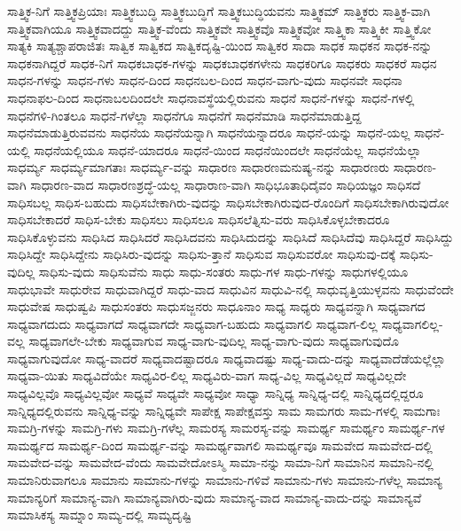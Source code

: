 {ಸಾತ್ತ್ವಿಕ-ನಿಗೆ
ಸಾತ್ತ್ವಿಕಪ್ರಿಯಾಃ
ಸಾತ್ತ್ವಿಕಬುದ್ಧಿ
ಸಾತ್ತ್ವಿಕಬುದ್ಧಿಗೆ
ಸಾತ್ತ್ವಿಕಬುದ್ಧಿಯವನು
ಸಾತ್ತ್ವಿಕಮ್
ಸಾತ್ತ್ವಿಕರು
ಸಾತ್ತ್ವಿಕ-ವಾಗಿ
ಸಾತ್ತ್ವಿಕವಾಗಿಯೂ
ಸಾತ್ತ್ವಿಕವಾದದ್ದು
ಸಾತ್ತ್ವಿಕ-ವೆಂದು
ಸಾತ್ತ್ವಿಕವೇ
ಸಾತ್ತ್ವಿಕವೊ
ಸಾತ್ತ್ವಿಕವೋ
ಸಾತ್ತ್ವಿಕಾ
ಸಾತ್ತ್ವಿಕೀ
ಸಾತ್ತ್ವಿಕೋ
ಸಾತ್ಯಕಿ
ಸಾತ್ಯಶ್ಚಾಪರಾಜಿತಃ
ಸಾತ್ವಿಕ
ಸಾತ್ವಿಕದ
ಸಾತ್ವಿಕದೃಷ್ಟಿ-ಯಿಂದ
ಸಾತ್ವಿಕರ
ಸಾದಾ
ಸಾಧಕ
ಸಾಧಕನ
ಸಾಧಕ-ನನ್ನು
ಸಾಧಕನಾಗಿದ್ದರೆ
ಸಾಧಕ-ನಿಗೆ
ಸಾಧಕಬಾಧಕ-ಗಳನ್ನು
ಸಾಧಕಬಾಧಕಗಳೇನು
ಸಾಧಕರಿಗೂ
ಸಾಧಕರು
ಸಾಧಕರೆ
ಸಾಧನ
ಸಾಧನ-ಗಳನ್ನು
ಸಾಧನ-ಗಳು
ಸಾಧನ-ದಿಂದ
ಸಾಧನಬಲ-ದಿಂದ
ಸಾಧನ-ವಾಗು-ವುದು
ಸಾಧನವೇ
ಸಾಧನಾ
ಸಾಧನಾಫಲ-ದಿಂದ
ಸಾಧನಾಬಲದಿಂದಲೇ
ಸಾಧನಾವಸ್ಥೆಯಲ್ಲಿರುವನು
ಸಾಧನೆ
ಸಾಧನೆ-ಗಳನ್ನು
ಸಾಧನೆ-ಗಳಲ್ಲಿ
ಸಾಧನೆಗಳಿ-ಗಿಂತಲೂ
ಸಾಧನೆ-ಗಳೆಲ್ಲಾ
ಸಾಧನೆಗೂ
ಸಾಧನೆಗೆ
ಸಾಧನೆಮಾಡಿ
ಸಾಧನೆಮಾಡುತ್ತಿದ್ದ
ಸಾಧನೆಮಾಡುತ್ತಿರುವವನು
ಸಾಧನೆಯ
ಸಾಧನೆಯನ್ನಾಗಿ
ಸಾಧನೆಯನ್ನಾದರೂ
ಸಾಧನೆ-ಯನ್ನು
ಸಾಧನೆ-ಯಲ್ಲ
ಸಾಧನೆ-ಯಲ್ಲಿ
ಸಾಧನೆಯಲ್ಲಿಯೂ
ಸಾಧನೆ-ಯಾದರೂ
ಸಾಧನೆ-ಯಿಂದ
ಸಾಧನೆಯಿಂದಲೇ
ಸಾಧನೆಯೆಲ್ಲ
ಸಾಧನೆಯೆಲ್ಲಾ
ಸಾಧರ್ಮ್ಯ
ಸಾಧರ್ಮ್ಯಮಾಗತಾಃ
ಸಾಧರ್ಮ್ಯ-ವನ್ನು
ಸಾಧಾರಣ
ಸಾಧಾರಣಮನುಷ್ಯ-ನನ್ನು
ಸಾಧಾರಣರು
ಸಾಧಾರಣ-ವಾಗಿ
ಸಾಧಾರಣ-ವಾದ
ಸಾಧಾರಣಶ್ರದ್ಧೆ-ಯಲ್ಲ
ಸಾಧಾರಾಣ-ವಾಗಿ
ಸಾಧಿಭೂತಾಧಿದೈವಂ
ಸಾಧಿಯಜ್ಞಂ
ಸಾಧಿಸದೆ
ಸಾಧಿಸಬಲ್ಲ
ಸಾಧಿಸ-ಬಹುದು
ಸಾಧಿಸಬೇಕಾಗಿರು-ವುದನ್ನು
ಸಾಧಿಸಬೇಕಾಗಿರುವುದ-ರೊಂದಿಗೆ
ಸಾಧಿಸಬೇಕಾಗಿರುವುದೋ
ಸಾಧಿಸಬೇಕಾದರೆ
ಸಾಧಿಸ-ಬೇಕು
ಸಾಧಿಸಲು
ಸಾಧಿಸಲೂ
ಸಾಧಿಸಲೆತ್ನಿಸು-ವರು
ಸಾಧಿಸಿಕೊಳ್ಳಬೇಕಾದರೂ
ಸಾಧಿಸಿಕೊಳ್ಳುವನು
ಸಾಧಿಸಿದ
ಸಾಧಿಸಿದರೆ
ಸಾಧಿಸಿದವನು
ಸಾಧಿಸಿದುದನ್ನು
ಸಾಧಿಸಿದೆ
ಸಾಧಿಸಿದೆವು
ಸಾಧಿಸಿದ್ದರೆ
ಸಾಧಿಸಿದ್ದು
ಸಾಧಿಸಿದ್ದೇ
ಸಾಧಿಸಿದ್ದೇನು
ಸಾಧಿಸಿರು-ವುದನ್ನು
ಸಾಧಿಸು-ತ್ತಾನೆ
ಸಾಧಿಸುವ
ಸಾಧಿಸುವರೋ
ಸಾಧಿಸುವು-ದಕ್ಕೆ
ಸಾಧಿಸು-ವುದಿಲ್ಲ
ಸಾಧಿಸು-ವುದು
ಸಾಧಿಸುವೆನು
ಸಾಧು
ಸಾಧು-ಸಂತರು
ಸಾಧು-ಗಳ
ಸಾಧು-ಗಳನ್ನು
ಸಾಧುಗಳಲ್ಲಿಯೂ
ಸಾಧುಭಾವೇ
ಸಾಧುರೇವ
ಸಾಧುವಾಗಿದ್ದರೆ
ಸಾಧು-ವಾದ
ಸಾಧುವಿನ
ಸಾಧುವಿ-ನಲ್ಲಿ
ಸಾಧುವೃತ್ತಿಯುಳ್ಳವನು
ಸಾಧುವೆಂದೇ
ಸಾಧುವೇಷ
ಸಾಧುಷ್ವಪಿ
ಸಾಧುಸಂತರು
ಸಾಧುಸಜ್ಜನರು
ಸಾಧೂನಾಂ
ಸಾಧ್ಯ
ಸಾಧ್ಯರು
ಸಾಧ್ಯವನ್ನಾಗಿ
ಸಾಧ್ಯವಾಗದ
ಸಾಧ್ಯವಾಗದುದು
ಸಾಧ್ಯವಾಗದೆ
ಸಾಧ್ಯವಾಗದೇ
ಸಾಧ್ಯವಾಗ-ಬಹುದು
ಸಾಧ್ಯವಾಗಲಿ
ಸಾಧ್ಯವಾಗ-ಲಿಲ್ಲ
ಸಾಧ್ಯವಾಗಲಿಲ್ಲ-ವಲ್ಲ
ಸಾಧ್ಯವಾಗಲೇ-ಬೇಕು
ಸಾಧ್ಯವಾಗುವ
ಸಾಧ್ಯ-ವಾಗು-ವುದಿಲ್ಲ
ಸಾಧ್ಯ-ವಾಗು-ವುದು
ಸಾಧ್ಯವಾಗುವುದೊ
ಸಾಧ್ಯವಾಗುವುದೋ
ಸಾಧ್ಯ-ವಾದರೆ
ಸಾಧ್ಯವಾದಷ್ಟಾದರೂ
ಸಾಧ್ಯವಾದಷ್ಟು
ಸಾಧ್ಯ-ವಾದು-ದನ್ನು
ಸಾಧ್ಯವಾದೆಡೆಯಲ್ಲೆಲ್ಲಾ
ಸಾಧ್ಯವಾ-ಯಿತು
ಸಾಧ್ಯವಿದೆಯೇ
ಸಾಧ್ಯವಿರ-ಲಿಲ್ಲ
ಸಾಧ್ಯವಿರು-ವಾಗ
ಸಾಧ್ಯ-ವಿಲ್ಲ
ಸಾಧ್ಯವಿಲ್ಲದೆ
ಸಾಧ್ಯವಿಲ್ಲದೇ
ಸಾಧ್ಯವಿಲ್ಲವೊ
ಸಾಧ್ಯವಿಲ್ಲವೋ
ಸಾಧ್ಯವೆ
ಸಾಧ್ಯವೇ
ಸಾಧ್ಯವೋ
ಸಾಧ್ಯಾ
ಸಾನ್ನಿಧ್ಯ
ಸಾನ್ನಿಧ್ಯ-ದಲ್ಲಿ
ಸಾನ್ನಿಧ್ಯದಲ್ಲಿದ್ದರೂ
ಸಾನ್ನಿಧ್ಯದಲ್ಲಿರುವನು
ಸಾನ್ನಿಧ್ಯ-ವನ್ನು
ಸಾನ್ನಿಧ್ಯವೇ
ಸಾಪೇಕ್ಷ
ಸಾಪೇಕ್ಷವಸ್ತು
ಸಾಮ
ಸಾಮಗರು
ಸಾಮ-ಗಳಲ್ಲಿ
ಸಾಮಗಾಃ
ಸಾಮಗ್ರಿ-ಗಳನ್ನು
ಸಾಮಗ್ರಿ-ಗಳು
ಸಾಮಗ್ರಿ-ಗಳೆಲ್ಲ
ಸಾಮರಸ್ಯ
ಸಾಮರಸ್ಯ-ವನ್ನು
ಸಾಮರ್ಥ್ಯ
ಸಾಮರ್ಥ್ಯಂ
ಸಾಮರ್ಥ್ಯ-ಗಳ
ಸಾಮರ್ಥ್ಯದ
ಸಾಮರ್ಥ್ಯ-ದಿಂದ
ಸಾಮರ್ಥ್ಯ-ವನ್ನು
ಸಾಮರ್ಥ್ಯವಾಗಲಿ
ಸಾಮರ್ಥ್ಯವೂ
ಸಾಮವೇದ
ಸಾಮವೇದ-ದಲ್ಲಿ
ಸಾಮವೇದ-ವನ್ನು
ಸಾಮವೇದ-ವೆಂದು
ಸಾಮವೇದೋಽಸ್ಮಿ
ಸಾಮಾ-ನನ್ನು
ಸಾಮಾ-ನಿಗೆ
ಸಾಮಾನಿನ
ಸಾಮಾನಿ-ನಲ್ಲಿ
ಸಾಮಾನಿರುವಾಗಲೂ
ಸಾಮಾನು
ಸಾಮಾನು-ಗಳನ್ನು
ಸಾಮಾನು-ಗಳಿವೆ
ಸಾಮಾನು-ಗಳು
ಸಾಮಾನು-ಗಳೆಲ್ಲ
ಸಾಮಾನ್ಯ
ಸಾಮಾನ್ಯರಿಗೆ
ಸಾಮಾನ್ಯ-ವಾಗಿ
ಸಾಮಾನ್ಯವಾಗಿರು-ವುದು
ಸಾಮಾನ್ಯ-ವಾದ
ಸಾಮಾನ್ಯ-ವಾದು-ದನ್ನು
ಸಾಮಾನ್ಯವೆ
ಸಾಮಾಸಿಕಸ್ಯ
ಸಾಮ್ನಾಂ
ಸಾಮ್ಯ-ದಲ್ಲಿ
ಸಾಮ್ಯದೃಷ್ಟಿ
}
